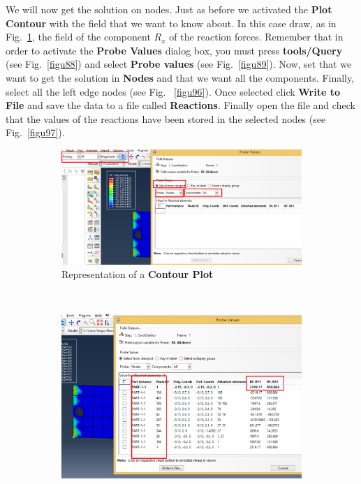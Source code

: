 \begin{enumerate}
 We will now get the solution on nodes. Just as before we activated
 the \textbf{Plot Contour} with the field that we want to know
 about. In this case draw, as in Fig.~\ref{figu95}, the field of the component
 $R_{x}$ of the reaction forces. Remember that in order to activate
 the \textbf {Probe Values} dialog box, you must press
 \textbf{tools/Query} (see Fig.~\ref{figu88}) and select \textbf{Probe
   values} (see Fig.~\ref{figu89}). Now, set that we want to get the
 solution in \textbf{Nodes} and that we want all the
 components. Finally, select all the left edge nodes (see Fig.~
 \ref{figu96}). Once selected click \textbf{Write to File} and save
 the data to a file called \textbf{Reactions}. Finally open the file
 and check that the values of the reactions have been stored in the
 selected nodes (see Fig.~\ref{figu97}).
 \begin{figure}[H]
   \centering
   \begin{subfigure}{0.30\textwidth}
     \includegraphics[width=\textwidth]{./body/images/imagen95.pdf}
     \caption{Representation of a \textbf{Contour Plot}}
     \label{figu95}
   \end{subfigure}%
   ~ %
   \begin{subfigure}{0.30\textwidth}
     \includegraphics[width=\textwidth]{./body/images/imagen96.pdf}

\end{subfigure}
\end{figure}
\end{enumerate}
